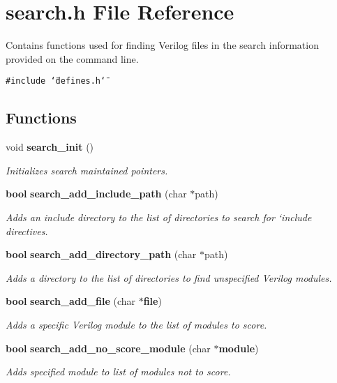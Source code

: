 \section{search.h File Reference}
\label{search_8h}
Contains functions used for finding Verilog files in the search information provided on the command line.  


{\tt \#include \char`\"{}defines.h\char`\"{}}\par
\subsection*{Functions}
\begin{CompactItemize}
\item 
void {\bf search\_\-init} ()
\begin{CompactList}\small\item\em Initializes search maintained pointers. \item\end{CompactList}\item 
{\bf bool} {\bf search\_\-add\_\-include\_\-path} (char $\ast$path)
\begin{CompactList}\small\item\em Adds an include directory to the list of directories to search for `include directives. \item\end{CompactList}\item 
{\bf bool} {\bf search\_\-add\_\-directory\_\-path} (char $\ast$path)
\begin{CompactList}\small\item\em Adds a directory to the list of directories to find unspecified Verilog modules. \item\end{CompactList}\item 
{\bf bool} {\bf search\_\-add\_\-file} (char $\ast${\bf file})
\begin{CompactList}\small\item\em Adds a specific Verilog module to the list of modules to score. \item\end{CompactList}\item 
{\bf bool} {\bf search\_\-add\_\-no\_\-score\_\-module} (char $\ast${\bf module})
\begin{CompactList}\small\item\em Adds specified module to list of modules not to score. \item\end{CompactList}\item 

\end{CompactItemize}
